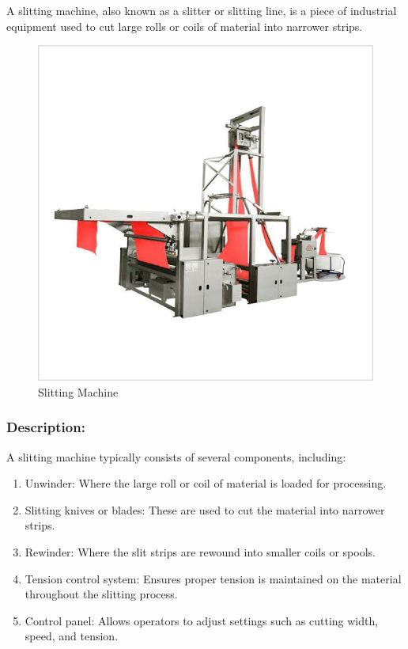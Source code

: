 A slitting machine, also known as a slitter or slitting line, is a piece
of industrial equipment used to cut large rolls or coils of material
into narrower strips.



\begin{figure}[h!]
  \centering
  \includegraphics[width=0.8\linewidth]{figs/production/image2.jpg}
  \caption{Slitting Machine}
  \label{fig:Slitting Machine}
\end{figure}


\subsubsection{Description:}

A slitting machine typically consists of several components, including:

\begin{enumerate}
\item
  Unwinder: Where the large roll or coil of material is loaded for
  processing.
\item
  Slitting knives or blades: These are used to cut the material into
  narrower strips.
\item
  Rewinder: Where the slit strips are rewound into smaller coils or
  spools.
\item
  Tension control system: Ensures proper tension is maintained on the
  material throughout the slitting process.
\item
  Control panel: Allows operators to adjust settings such as cutting
  width, speed, and tension.
\end{enumerate}

